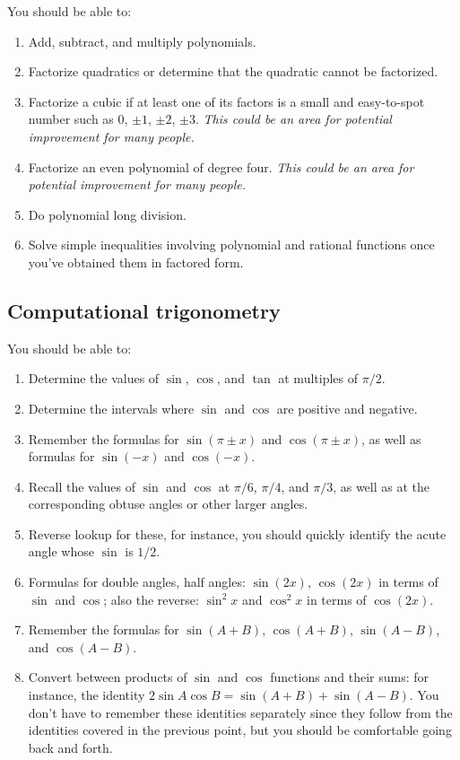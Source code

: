 \documentclass[10pt]{amsart}
\begin{document}
You should be able to:

\begin{enumerate}
\item Add, subtract, and multiply polynomials.
\item Factorize quadratics or determine that the quadratic cannot be
  factorized.
\item Factorize a cubic if at least one of its factors is a small and
  easy-to-spot number such as $0$, $\pm 1$, $\pm 2$, $\pm 3$. {\em
  This could be an area for potential improvement for many people.}
\item Factorize an even polynomial of degree four. {\em This could be
  an area for potential improvement for many people.}
\item Do polynomial long division.
\item Solve simple inequalities involving polynomial and rational
  functions once you've obtained them in factored form.
\end{enumerate}

\subsection{Computational trigonometry}

You should be able to:

\begin{enumerate}
\item Determine the values of $\sin$, $\cos$, and $\tan$ at multiples
  of $\pi/2$.
\item Determine the intervals where $\sin$ and $\cos$ are positive and
  negative.
\item Remember the formulas for $\sin(\pi \pm x )$ and $\cos(\pi \pm x)$,
  as well as formulas for $\sin(-x)$ and $\cos(-x)$.
\item Recall the values of $\sin$ and $\cos$ at $\pi/6$, $\pi/4$, and
  $\pi/3$, as well as at the corresponding obtuse angles or other
  larger angles.
\item Reverse lookup for these, for instance, you should quickly
  identify the acute angle whose $\sin$ is $1/2$.
\item Formulas for double angles, half angles: $\sin(2x)$, $\cos(2x)$
  in terms of $\sin$ and $\cos$; also the reverse: $\sin^2x$ and
  $\cos^2x$ in terms of $\cos(2x)$.
\item Remember the formulas for $\sin(A + B)$, $\cos(A + B)$, $\sin(A
  - B)$, and $\cos(A - B)$.
\item Convert between products of $\sin$ and $\cos$ functions and
  their sums: for instance, the identity $2\sin A \cos B = \sin(A + B)
  + \sin (A - B)$. You don't have to remember these identities
  separately since they follow from the identities covered in the
  previous point, but you should be comfortable going back and forth.
\end{enumerate}
\end{document}
